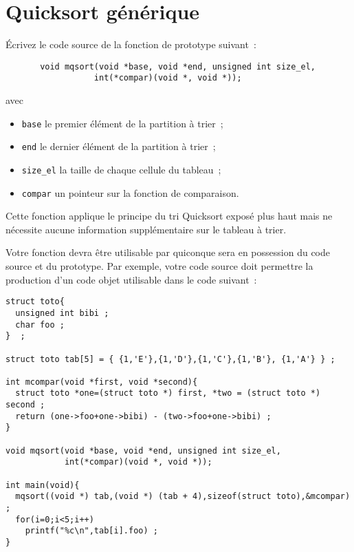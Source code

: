 \documentclass{article}
\begin{document}
\section{Quicksort g\'en\'erique}

\'Ecrivez le code source de la fonction de prototype suivant~:
\begin{verbatim}
       void mqsort(void *base, void *end, unsigned int size_el,
                  int(*compar)(void *, void *));
\end{verbatim}
avec
\begin{itemize}
\item \texttt{base} le premier \'el\'ement de la partition \`a trier~;
\item \texttt{end} le dernier \'el\'ement de la partition \`a trier~;
\item \texttt{size\_el} la taille de chaque cellule du tableau~;
\item \texttt{compar} un pointeur sur la fonction de comparaison.
\end{itemize}

Cette fonction applique le principe du tri Quicksort expos\'e plus
haut mais ne n\'ecessite aucune information suppl\'ementaire sur le
tableau \`a trier.

Votre fonction devra \^etre utilisable par quiconque sera en
possession du code source et du prototype. Par exemple, votre code
source doit permettre la production d'un code objet utilisable dans le
code suivant~:
\begin{verbatim}
struct toto{
  unsigned int bibi ;
  char foo ;
}  ;

struct toto tab[5] = { {1,'E'},{1,'D'},{1,'C'},{1,'B'}, {1,'A'} } ;

int mcompar(void *first, void *second){
  struct toto *one=(struct toto *) first, *two = (struct toto *) second ;
  return (one->foo+one->bibi) - (two->foo+one->bibi) ;
}

void mqsort(void *base, void *end, unsigned int size_el,
            int(*compar)(void *, void *));

int main(void){
  mqsort((void *) tab,(void *) (tab + 4),sizeof(struct toto),&mcompar) ;
  for(i=0;i<5;i++) 
    printf("%c\n",tab[i].foo) ;
}
\end{verbatim}
\end{document}
